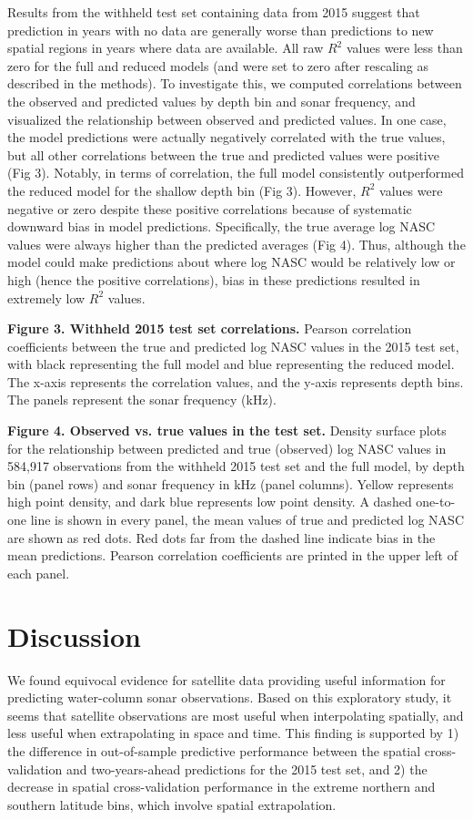 \documentclass[10pt,letterpaper]{article}
\begin{document}
Results from the withheld test set containing data from 2015 suggest that prediction in years with no data are generally worse than predictions to new spatial regions in years where data are available. 
All raw $R^2$ values were less than zero for the full and reduced models (and were set to zero after rescaling as described in the methods).
To investigate this, we computed correlations between the observed and predicted values by depth bin and sonar frequency, and visualized the relationship between observed and predicted values. 
In one case, the model predictions were actually negatively correlated with the true values, but all other correlations between the true and predicted values were positive (Fig 3). 
Notably, in terms of correlation, the full model consistently outperformed the reduced model for the shallow depth bin (Fig 3).
However, $R^2$ values were negative or zero despite these positive correlations because of systematic downward bias in model predictions. 
Specifically, the true average log NASC values were always higher than the predicted averages (Fig 4).
Thus, although the model could make predictions about where log NASC would be relatively low or high (hence the positive correlations), bias in these predictions resulted in extremely low $R^2$ values. 

{\bf Figure 3. Withheld 2015 test set correlations.} Pearson correlation coefficients between the true and predicted log NASC values in the 2015 test set, with black representing the full model and blue representing the reduced model. The x-axis represents the correlation values, and the y-axis represents depth bins. The panels represent the sonar frequency (kHz).

{\bf Figure 4. Observed vs. true values in the test set.} Density surface plots for the relationship between predicted and true (observed) log NASC values in 584,917 observations from the withheld 2015 test set and the full model, by depth bin (panel rows) and sonar frequency in kHz (panel columns). Yellow represents high point density, and dark blue represents low point density. A dashed one-to-one line is shown in every panel, the mean values of true and predicted log NASC are shown as red dots. Red dots far from the dashed line indicate bias in the mean predictions. Pearson correlation coefficients are printed in the upper left of each panel.

\section*{Discussion}
We found equivocal evidence for satellite data providing useful information for predicting water-column sonar observations. 
Based on this exploratory study, it seems that satellite observations are most useful when interpolating spatially, and less useful when extrapolating in space and time. 
This finding is supported by 1) the difference in out-of-sample predictive performance between the spatial cross-validation and two-years-ahead predictions for the 2015 test set, and 2) the decrease in spatial cross-validation performance in the extreme northern and southern latitude bins, which involve spatial extrapolation.
\end{document}
